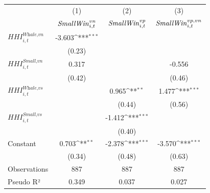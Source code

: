 {
\def\sym#1{\ifmmode^{#1}\else\(^{#1}\)\fi}
\begin{tabular}{l*{3}{c}}
\toprule
                    &\multicolumn{1}{c}{(1)}&\multicolumn{1}{c}{(2)}&\multicolumn{1}{c}{(3)}\\
                    &\multicolumn{1}{c}{${\it Small Win}^{vn}_{i,t}$}&\multicolumn{1}{c}{${\it Small Win}^{vp}_{i,t}$}&\multicolumn{1}{c}{${\it Small Win}^{vp,vn}_{i,t}$}\\
\midrule
$\textit{HHI}_{i,t}^{\textit{Whale,vn}}$&      -3.603\sym{***}&                     &                     \\
                    &      (0.23)         &                     &                     \\
$\textit{HHI}_{i,t}^{\textit{Small,vn}}$&       0.317         &                     &      -0.556         \\
                    &      (0.42)         &                     &      (0.46)         \\
$\textit{HHI}_{i,t}^{\textit{Whale,vs}}$&                     &       0.965\sym{**} &       1.477\sym{***}\\
                    &                     &      (0.44)         &      (0.56)         \\
$\textit{HHI}_{i,t}^{\textit{Small,vs}}$&                     &      -1.412\sym{***}&                     \\
                    &                     &      (0.40)         &                     \\
Constant            &       0.703\sym{**} &      -2.378\sym{***}&      -3.570\sym{***}\\
                    &      (0.34)         &      (0.48)         &      (0.63)         \\
\midrule
Observations        &         887         &         887         &         887         \\
Pseudo R²           &       0.349         &       0.037         &       0.027         \\
\bottomrule
\end{tabular}
}
